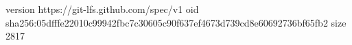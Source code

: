 version https://git-lfs.github.com/spec/v1
oid sha256:05dfffe22010c99942fbc7c30605c90f637ef4673d739cd8e60692736bf65fb2
size 2817
